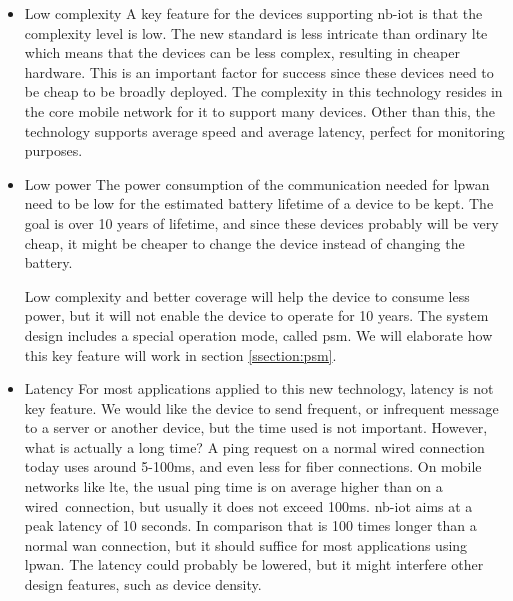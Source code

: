 \documentclass[USenglish]{ifimaster}  %
\begin{document}
\begin{itemize}
  \item Low complexity \newline %
  A key feature for the devices supporting \acrshort{nb-iot} is that the complexity level is low. The new standard is less intricate than ordinary \acrshort{lte} which means that the devices can be less complex, resulting in cheaper hardware. This is an important factor for success since these devices need to be cheap to be broadly deployed. The complexity in this technology resides in the core mobile network for it to support many devices. Other than this, the technology supports average speed and average latency, perfect for monitoring purposes.

  \item Low power \newline
  The power consumption of the communication needed for \acrshort{lpwan} need to be low for the estimated battery lifetime of a device to be kept. The goal is over 10 years of lifetime, and since these devices probably will be very cheap, it might be cheaper to change the device instead of changing the battery.

  Low complexity and better coverage will help the device to consume less power, but it will not enable the device to operate for 10 years. The system design includes a special operation mode, called \acrlong{psm}. We will elaborate how this key feature will work in section \vref{ssection:psm}.

  \item Latency \newline
  For most applications applied to this new technology, latency is not key feature. We would like the device to send frequent, or infrequent message to a server or another device, but the time used is not important. However, what is actually a long time? A ping request on a normal wired connection today uses around 5-100ms, and even less for fiber connections. On mobile networks like \acrshort{lte}, the usual ping time is on average higher than on a wired connection, but usually it does not exceed 100ms. \acrshort{nb-iot} aims at a peak latency of 10 seconds. In comparison that is 100 times longer than a normal \acrshort{wan} connection, but it should suffice for most applications using \acrshort{lpwan}. The latency could probably be lowered, but it might interfere other design features, such as device density.


\end{itemize}
\end{document}
